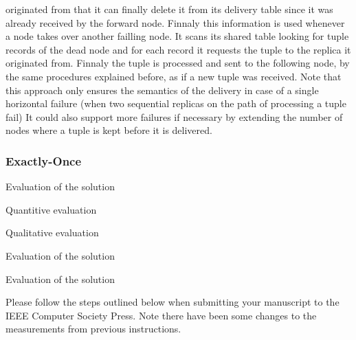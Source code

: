 \documentclass[times, 10pt,twocolumn]{article}
\begin{document}
originated from that it can finally delete it from its delivery table
since it was already received by the forward node. Finnaly this
information is used whenever a node takes over another failling node. It
scans its shared table looking for tuple records of the dead node and for
each record it requests the tuple to the replica it originated from.
Finnaly the tuple is processed and sent to the following node, by the same
procedures explained before, as if a new tuple was received. Note
that this approach only ensures the semantics of the delivery in case of a 
single horizontal failure (when two sequential replicas on the path of
processing a tuple fail) It could also support more failures if
necessary by extending the number of nodes where a tuple is kept
before it is delivered.


\subsubsection{Exactly-Once}


Evaluation of the solution


Quantitive evaluation


Qualitative evaluation


Evaluation of the solution


Evaluation of the solution


Please follow the steps outlined below when submitting your manuscript to
the IEEE Computer Society Press. Note there have been some changes to the
measurements from previous instructions. 

\end{document}

